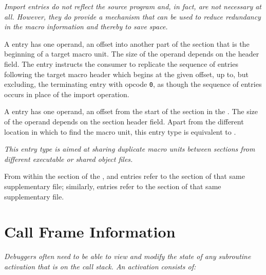 \textit{Import entries do not reflect the source program
and, in fact, are not necessary at all. However, they do
provide a mechanism that can be used to reduce redundancy
in the macro information and thereby to save space.}

\begin{enumerate}[1. ]

\itembfnl{\DWMACROimportTARG{}}
A \DWMACROimportNAME{} entry has one operand, an offset into
another part of the \dotdebugmacro{} section that is
the beginning of a target macro unit. The size of the operand
depends on the header \HFNoffsetsizeflag{} field.  The
\DWMACROimportNAME{} entry instructs the consumer to
replicate the sequence of entries following the target macro 
header which begins at the given 
\dotdebugmacro{} offset, up to, but excluding,
the terminating entry with opcode \texttt{0},
as though 
\bb
the sequence of entries
\eb
occurs in place of the import operation.

\itembfnl{\DWMACROimportsupTARG}
A \DWMACROimportsupNAME{} entry has one operand, an 
offset from the start of the \dotdebugmacro{} section in the 
.  
The size of the operand depends on the section header 
\HFNoffsetsizeflag{} field. 
Apart from the different location in which to find the macro unit,
this entry type is equivalent to \DWMACROimport. 

\textit{This entry type is aimed at sharing duplicate 
macro units between \dotdebugmacro{}
sections from different executable or shared object files.}  

From within the \dotdebugmacro{} section of the 
, \DWMACROdefinestrp{} 
and \DWMACROundefstrp{} entries refer to the
\dotdebugstr{} section of that same supplementary file;
similarly, \DWMACROimport{} entries refer to the 
\dotdebugmacro{} section of that same supplementary file.

\end{enumerate}


\section{Call Frame Information}
\label{chap:callframeinformation}

\textit{Debuggers often need to be able to view and modify the 
state of any subroutine activation that is
on the call stack. An activation consists of:}

